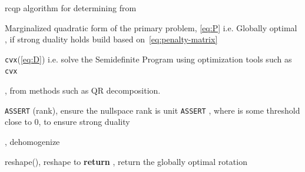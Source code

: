 \begin{algorithm}
	\algrenewcommand{}
	\algrenewcommand{}
	\caption{\gls{rcqp} algorithm for determining \tf[R]{\star}{} from }
	\label{alg:rcqp}
	\begin{algorithmic}[1]
		\Require Marginalized quadratic form of the primary problem, \ref{eq:P} i.e. 
		\Ensure Globally optimal \tf[R]{\star}{}, if strong duality holds
		\State {} build based on~\ref{eq:penalty-matrix}

		\State {} \texttt{cvx}(\ref{eq:D}) i.e. solve the Semidefinite Program using optimization tools such as \texttt{cvx} 

		\State {}, from methods such as QR decomposition.

		\State \texttt{ASSERT} (rank), ensure the nullspace rank is unit
		\State \texttt{ASSERT}   , where \mvar{\epsilon} is some threshold close to \num{0}, to ensure strong duality
		
		\State {}, dehomogenize 

		\State \mvar{\tf[R]{\star}{} \gets} reshape(), reshape  to 
		\State \textbf{return} \tf[R]{\star}{}, return the globally optimal rotation
	\end{algorithmic}
\end{algorithm}



